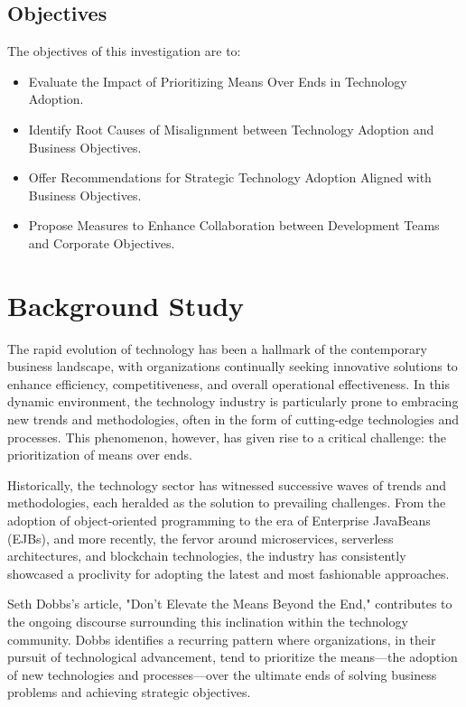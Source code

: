\documentclass[a4Paper]{article}
\begin{document}
\subsection{Objectives}
The objectives of this investigation are to:
\begin{itemize}
\item Evaluate the Impact of Prioritizing Means Over Ends in Technology Adoption.
\item Identify Root Causes of Misalignment between Technology Adoption and Business Objectives.
\item Offer Recommendations for Strategic Technology Adoption Aligned with Business Objectives.
\item Propose Measures to Enhance Collaboration between Development Teams and Corporate Objectives.
\end{itemize}
\pagebreak

\section{Background Study}
The rapid evolution of technology has been a hallmark of the contemporary business landscape, with organizations continually seeking innovative solutions to enhance efficiency, competitiveness, and overall operational effectiveness. In this dynamic environment, the technology industry is particularly prone to embracing new trends and methodologies, often in the form of cutting-edge technologies and processes. This phenomenon, however, has given rise to a critical challenge: the prioritization of means over ends.

Historically, the technology sector has witnessed successive waves of trends and methodologies, each heralded as the solution to prevailing challenges. From the adoption of object-oriented programming to the era of Enterprise JavaBeans (EJBs), and more recently, the fervor around microservices, serverless architectures, and blockchain technologies, the industry has consistently showcased a proclivity for adopting the latest and most fashionable approaches.

Seth Dobbs's article, "Don't Elevate the Means Beyond the End," contributes to the ongoing discourse surrounding this inclination within the technology community. Dobbs identifies a recurring pattern where organizations, in their pursuit of technological advancement, tend to prioritize the means—the adoption of new technologies and processes—over the ultimate ends of solving business problems and achieving strategic objectives.
\end{document}
